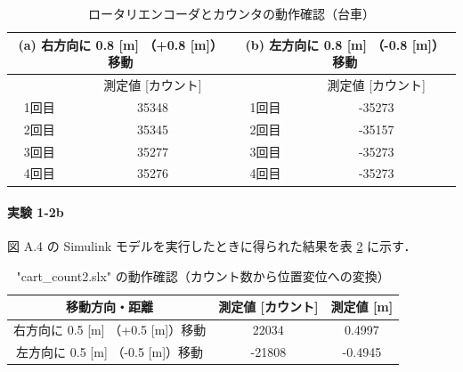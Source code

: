 \begin{table}[h]
  \centering
  \caption{ロータリエンコーダとカウンタの動作確認（台車）}
  \label{tab:exp_1_2a}
  \begin{tabular}{|c|c|c|c|}
    \hline
    \multicolumn{2}{|c|}{(a) 右方向に 0.8 [m] （+0.8 [m]）移動} & \multicolumn{2}{|c|}{(b) 左方向に 0.8 [m] （-0.8 [m]）移動}                             \\
    \hline
                                                                & 測定値 [カウント]                                           &       & 測定値 [カウント] \\
    \hline
    1回目                                                       & 35348                                                       & 1回目 & -35273            \\
    \hline
    2回目                                                       & 35345                                                       & 2回目 & -35157            \\
    \hline
    3回目                                                       & 35277                                                       & 3回目 & -35273            \\
    \hline
    4回目                                                       & 35276                                                       & 4回目 & -35273            \\
    \hline
  \end{tabular}
\end{table}

\paragraph{実験 1-2b}

図 A.4 の Simulink モデルを実行したときに得られた結果を表 \ref{tab:exp_1_2b} に示す．

\begin{table}[h]
  \centering
  \caption{"cart\_count2.slx" の動作確認（カウント数から位置変位への変換）}
  \label{tab:exp_1_2b}
  \begin{tabular}{|c|c|c|}
    \hline
    移動方向・距離                    & 測定値 [カウント] & 測定値 [m] \\
    \hline
    右方向に 0.5 [m] （+0.5 [m]）移動 & 22034             & 0.4997     \\
    \hline
    左方向に 0.5 [m] （-0.5 [m]）移動 & -21808            & -0.4945    \\
    \hline
  \end{tabular}
\end{table}

